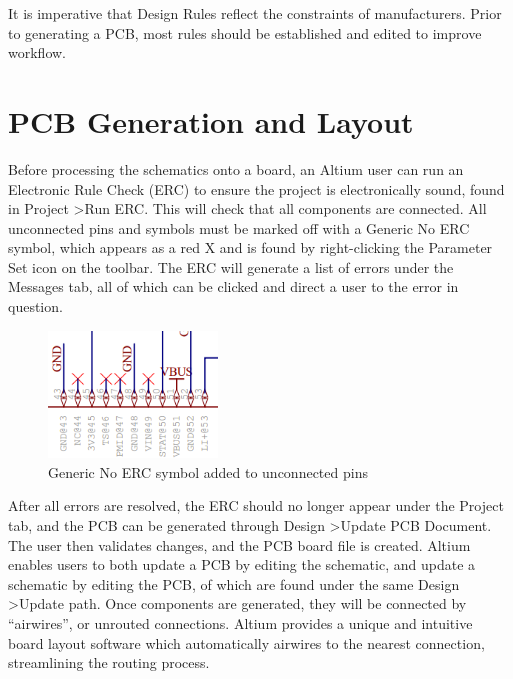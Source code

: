 \documentclass[twocolumn]{article}
\begin{document}
It is imperative that Design Rules reflect the constraints of manufacturers. Prior to generating a PCB, most rules should be established and edited to improve workflow.

\section{PCB Generation and Layout}

Before processing the schematics onto a board, an Altium user can run an Electronic Rule Check (ERC) to ensure the project is electronically sound, found in Project \textgreater Run ERC. This will check that all components are connected. All unconnected pins and symbols must be marked off with a Generic No ERC symbol, which appears as a red X and is found by right-clicking the Parameter Set icon on the toolbar. The ERC will generate a list of errors under the Messages tab, all of which can be clicked and direct a user to the error in question.

\begin{figure}[ht]
    \centering
    \includegraphics[width=0.4\textwidth]{noERC.png}
    \caption{Generic No ERC symbol added to unconnected pins}
    \label{fig:No-ERC}
\end{figure}

After all errors are resolved, the ERC should no longer appear under the Project tab, and the PCB can be generated through Design \textgreater Update PCB Document. The user then validates changes, and the PCB board file is created. Altium enables users to both update a PCB by editing the schematic, and update a schematic by editing the PCB, of which are found under the same Design \textgreater Update path. Once components are generated, they will be connected by “airwires”, or unrouted connections. Altium provides a unique and intuitive board layout software which automatically airwires to the nearest connection, streamlining the routing process.
\end{document}
